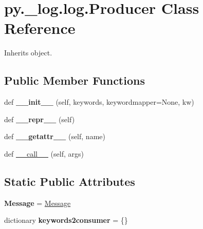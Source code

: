 \hypertarget{classpy_1_1__log_1_1log_1_1_producer}{}\section{py.\+\_\+log.\+log.\+Producer Class Reference}
\label{classpy_1_1__log_1_1log_1_1_producer}


Inherits object.

\subsection*{Public Member Functions}
\begin{DoxyCompactItemize}
\item 
\mbox{\label{classpy_1_1__log_1_1log_1_1_producer_a392f2e0f3dd3b43c2db56142a3c42544}} 
def {\bfseries \+\_\+\+\_\+init\+\_\+\+\_\+} (self, keywords, keywordmapper=None, kw)
\item 
\mbox{\label{classpy_1_1__log_1_1log_1_1_producer_a1ccb3fd8b1b18a37baa0f4299a1feb0a}} 
def {\bfseries \+\_\+\+\_\+repr\+\_\+\+\_\+} (self)
\item 
\mbox{\label{classpy_1_1__log_1_1log_1_1_producer_af318fa4f93cf045cb5641885572d5feb}} 
def {\bfseries \+\_\+\+\_\+getattr\+\_\+\+\_\+} (self, name)
\item 
def \hyperlink{classpy_1_1__log_1_1log_1_1_producer_a2fe1c3ecb78caaeaa72ddebb9e7ff410}{\+\_\+\+\_\+call\+\_\+\+\_\+} (self, args)
\end{DoxyCompactItemize}
\subsection*{Static Public Attributes}
\begin{DoxyCompactItemize}
\item 
\mbox{\label{classpy_1_1__log_1_1log_1_1_producer_ad99bad59e3fd05ff0a922f095826d69b}} 
{\bfseries Message} = \hyperlink{classpy_1_1__log_1_1log_1_1_message}{Message}
\item 
\mbox{\label{classpy_1_1__log_1_1log_1_1_producer_a108be7a3e109be312c2be539f6d46c55}} 
dictionary {\bfseries keywords2consumer} = \{\}
\end{DoxyCompactItemize}



